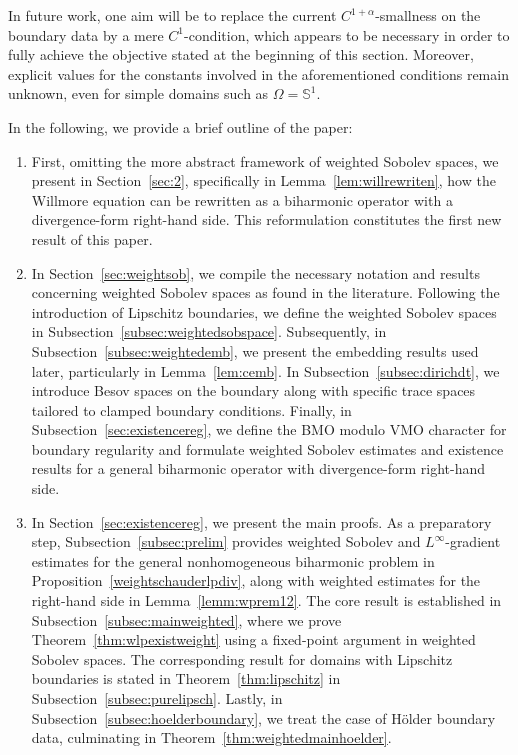 \documentclass[12pt,a4paper,twoside]{article}
\begin{document}
In future work, one aim will be to replace the current $C^{1+\alpha}$-smallness on the boundary data by a mere $C^{1}$-condition, which appears to be necessary in order to fully achieve the objective stated at the beginning of this section. Moreover, explicit values for the constants involved in the aforementioned conditions remain unknown, even for simple domains such as $\Omega=\mathbb S^1$.

In the following, we provide a brief outline of the paper:
\begin{enumerate}
    \item[]  First, omitting the more abstract framework of weighted Sobolev spaces, we present in Section~\ref{sec:2}, specifically in Lemma~\ref{lem:willrewriten}, how the Willmore equation can be rewritten as a biharmonic operator with a divergence-form right-hand side. This reformulation constitutes the first new result of this paper.
    \\
    \item[]   In Section~\ref{sec:weightsob}, we compile the necessary notation and results concerning weighted Sobolev spaces as found in the literature. Following the introduction of Lipschitz boundaries, we define the weighted Sobolev spaces in Subsection~\ref{subsec:weightedsobspace}. Subsequently, in Subsection~\ref{subsec:weightedemb}, we present the embedding results used later, particularly in Lemma~\ref{lem:cemb}. In Subsection~\ref{subsec:dirichdt}, we introduce Besov spaces on the boundary along with specific trace spaces tailored to clamped boundary conditions. Finally, in Subsection~\ref{sec:existencereg}, we define the BMO modulo VMO character for boundary regularity and formulate weighted Sobolev estimates and existence results for a general biharmonic operator with divergence-form right-hand side.\\
    \item[] In Section~\ref{sec:existencereg}, we present the main proofs. As a preparatory step, Subsection~\ref{subsec:prelim} provides weighted Sobolev and $L^\infty$-gradient estimates for the general nonhomogeneous biharmonic problem in Proposition~\ref{weightschauderlpdiv}, along with weighted estimates for the right-hand side in Lemma~\ref{lemm:wprem12}. The core result is established in Subsection~\ref{subsec:mainweighted}, where we prove Theorem~\ref{thm:wlpexistweight} using a fixed-point argument in weighted Sobolev spaces. The corresponding result for domains with Lipschitz boundaries is stated in Theorem~\ref{thm:lipschitz} in Subsection~\ref{subsec:purelipsch}. Lastly, in Subsection~\ref{subsec:hoelderboundary}, we treat the case of Hölder boundary data, culminating in Theorem~\ref{thm:weightedmainhoelder}.
\end{enumerate}
\end{document}
